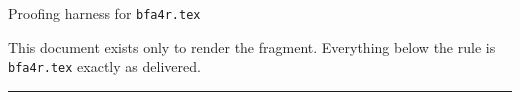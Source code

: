 \documentclass[a4paper,10pt]{article}
\begin{document}
\begin{center}
  {\Large Proofing harness for \texttt{bfa4r.tex}}
\end{center}
\noindent This document exists only to render the fragment. Everything below the
rule is \texttt{bfa4r.tex} exactly as delivered.

\hrule\vspace{1em}






\end{document}
